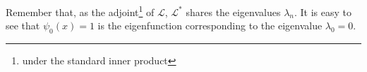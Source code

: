 Remember that, as the adjoint\footnote{under the standard inner product} of $\mathcal{L}$, $\mathcal{L}^*$ shares the eigenvalues $\lambda_n$. It is easy to see that $\psi_0(x)=1$ is the eigenfunction corresponding to the eigenvalue $\lambda_0 = 0$.















